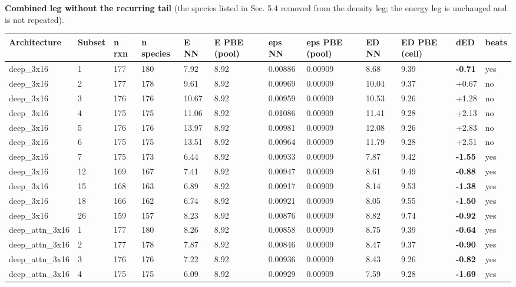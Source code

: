 \documentclass[10pt,a4paper]{article}
\begin{document}
\begin{landscape}
\textbf{Combined leg without the recurring tail} (the species listed in Sec. 5.4 removed from the density leg; the energy leg is unchanged and is not repeated).

\begin{footnotesize}
\begin{longtable}{llllllllllll}
\toprule Architecture & Subset & n rxn & n species & E NN & E PBE (pool) & eps NN & eps PBE (pool) & ED NN & ED PBE (cell) & dED & beats \\ \midrule \endhead
deep\_3x16 & 1 & 177 & 180 & 7.92 & 8.92 & 0.00886 & 0.00909 & 8.68 & 9.39 & \textbf{-0.71} & yes \\
deep\_3x16 & 2 & 177 & 178 & 9.61 & 8.92 & 0.00969 & 0.00909 & 10.04 & 9.37 & +0.67 & no \\
deep\_3x16 & 3 & 176 & 176 & 10.67 & 8.92 & 0.00959 & 0.00909 & 10.53 & 9.26 & +1.28 & no \\
deep\_3x16 & 4 & 175 & 175 & 11.06 & 8.92 & 0.01086 & 0.00909 & 11.41 & 9.28 & +2.13 & no \\
deep\_3x16 & 5 & 176 & 176 & 13.97 & 8.92 & 0.00981 & 0.00909 & 12.08 & 9.26 & +2.83 & no \\
deep\_3x16 & 6 & 175 & 175 & 13.51 & 8.92 & 0.00964 & 0.00909 & 11.79 & 9.28 & +2.51 & no \\
deep\_3x16 & 7 & 175 & 173 & 6.44 & 8.92 & 0.00933 & 0.00909 & 7.87 & 9.42 & \textbf{-1.55} & yes \\
deep\_3x16 & 12 & 169 & 167 & 7.41 & 8.92 & 0.00947 & 0.00909 & 8.61 & 9.49 & \textbf{-0.88} & yes \\
deep\_3x16 & 15 & 168 & 163 & 6.89 & 8.92 & 0.00917 & 0.00909 & 8.14 & 9.53 & \textbf{-1.38} & yes \\
deep\_3x16 & 18 & 166 & 162 & 6.74 & 8.92 & 0.00921 & 0.00909 & 8.05 & 9.55 & \textbf{-1.50} & yes \\
deep\_3x16 & 26 & 159 & 157 & 8.23 & 8.92 & 0.00876 & 0.00909 & 8.82 & 9.74 & \textbf{-0.92} & yes \\
deep\_attn\_3x16 & 1 & 177 & 180 & 8.26 & 8.92 & 0.00858 & 0.00909 & 8.75 & 9.39 & \textbf{-0.64} & yes \\
deep\_attn\_3x16 & 2 & 177 & 178 & 7.87 & 8.92 & 0.00846 & 0.00909 & 8.47 & 9.37 & \textbf{-0.90} & yes \\
deep\_attn\_3x16 & 3 & 176 & 176 & 7.22 & 8.92 & 0.00936 & 0.00909 & 8.43 & 9.26 & \textbf{-0.82} & yes \\
deep\_attn\_3x16 & 4 & 175 & 175 & 6.09 & 8.92 & 0.00929 & 0.00909 & 7.59 & 9.28 & \textbf{-1.69} & yes \\

\end{longtable}
\end{footnotesize}
\end{landscape}
\end{document}
